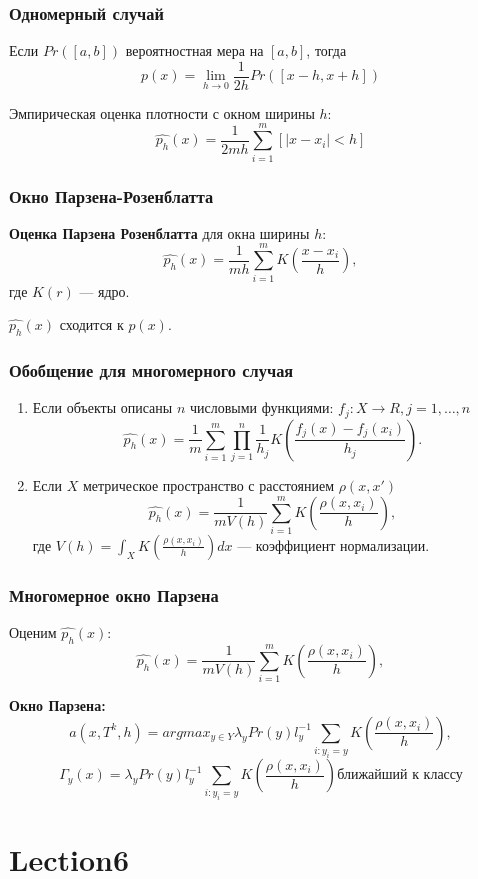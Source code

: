 \documentclass[10pt,a4paper,oneside,titlepage]{report}
\theoremstyle{defenition}
\theoremstyle{theorem}
\begin{document}
\subsubsection{Одномерный случай}

Если $Pr([a, b])$ вероятностная мера на $[a, b]$, тогда
$$
p(x) = \lim_{h\to0}\frac1{2h}Pr([x - h, x + h])
$$

Эмпирическая оценка плотности с окном ширины $h$:
$$
\hat{p_h}(x) = \frac1{2mh}\sum_{i=1}^m[|x - x_i| < h]
$$

\subsubsection{Окно Парзена-Розенблатта}

{\bfseries Оценка Парзена Розенблатта} для окна ширины $h$:
$$
\hat{p_h}(x) = \frac1{mh}\sum_{i=1}^mK(\frac{x - x_i}h),
$$
где $K(r)$ --- ядро.

$\hat{p_h}(x)$ сходится к $p(x)$.

\subsubsection{Обобщение для многомерного случая}

\begin{enumerate}
	\item Если объекты описаны $n$ числовыми функциями: $f_j:X \to R, j = 1, \ldots, n$
	$$
	\hat{p_h}(x) = \frac1m \sum_{i=1}^m\prod_{j=1}^n\frac1{h_j}K(\frac{f_j(x) - f_j(x_i)}{h_j}).
	$$
	\item Если $X$ метрическое пространство с расстоянием $\rho(x,x')$
	$$
	\hat{p_h}(x) = \frac1{mV(h)}\sum_{i=1}^mK(\frac{\rho(x, x_i)}h),
	$$
	где $V(h) = \int_X K(\frac{\rho(x, x_i)}h)dx$ --- коэффициент нормализации.
\end{enumerate}

\subsubsection{Многомерное окно Парзена}

Оценим $\hat{p_h}(x)$:
$$
\hat{p_h}(x) = \frac1{mV(h)}\sum_{i=1}^mK(\frac{\rho(x, x_i)}h),
$$

{\bfseries Окно Парзена:}
$$
a(x, T^k, h) = argmax_{y \in Y}\lambda_yPr(y)l_y^{-1}\sum_{i:y_i=y}K(\frac{\rho(x, x_i)}{h}),
$$
$$
\Gamma_y(x) = \lambda_yPr(y)l_y^{-1}\sum_{i:y_i=y}K(\frac{\rho(x, x_i)}{h}) \mbox{ближайший к классу}
$$

\section{Lection6}
\end{document}
